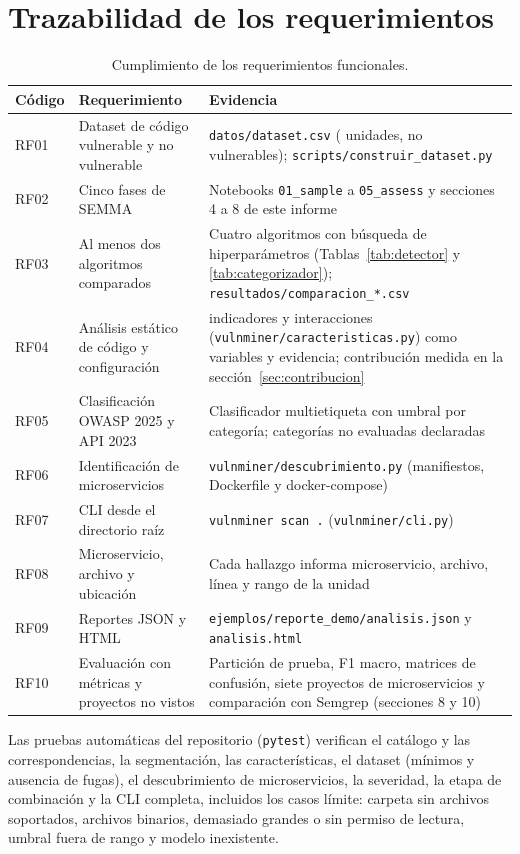 \documentclass[12pt,a4paper]{article}
\newcommand{\ruta}[1]{\nolinkurl{#1}}
\newcommand{\cod}[1]{\texttt{#1}}
\begin{document}
\section{Trazabilidad de los requerimientos}
\begin{table}[H]
\centering\footnotesize
\caption{Cumplimiento de los requerimientos funcionales.}
\label{tab:requisitos}
\begin{tabularx}{\textwidth}{@{}lP{4.3cm}Y@{}}
\toprule
\textbf{Código} & \textbf{Requerimiento} & \textbf{Evidencia}\\
\midrule
RF01 & Dataset de código vulnerable y no vulnerable & \ruta{datos/dataset.csv} (\nUnidades{} unidades, \nSeguras{} no vulnerables); \ruta{scripts/construir_dataset.py}\\
RF02 & Cinco fases de SEMMA & Notebooks \ruta{01_sample} a \ruta{05_assess} y secciones 4 a 8 de este informe\\
RF03 & Al menos dos algoritmos comparados & Cuatro algoritmos con búsqueda de hiperparámetros (Tablas~\ref{tab:detector} y \ref{tab:categorizador}); \ruta{resultados/comparacion_*.csv}\\
RF04 & Análisis estático de código y configuración & \nIndicadores{} indicadores y \nDerivadas{} interacciones (\ruta{vulnminer/caracteristicas.py}) como variables y evidencia; contribución medida en la sección~\ref{sec:contribucion}\\
RF05 & Clasificación OWASP 2025 y API 2023 & Clasificador multietiqueta con umbral por categoría; categorías no evaluadas declaradas\\
RF06 & Identificación de microservicios & \ruta{vulnminer/descubrimiento.py} (manifiestos, Dockerfile y docker-compose)\\
RF07 & CLI desde el directorio raíz & \cod{vulnminer scan .} (\ruta{vulnminer/cli.py})\\
RF08 & Microservicio, archivo y ubicación & Cada hallazgo informa microservicio, archivo, línea y rango de la unidad\\
RF09 & Reportes JSON y HTML & \ruta{ejemplos/reporte_demo/analisis.json} y \ruta{analisis.html}\\
RF10 & Evaluación con métricas y proyectos no vistos & Partición de prueba, F1 macro, matrices de confusión, siete proyectos de microservicios y comparación con Semgrep (secciones 8 y 10)\\
\bottomrule
\end{tabularx}
\end{table}

Las pruebas automáticas del repositorio (\cod{pytest}) verifican el catálogo y las correspondencias, la segmentación, las características, el dataset (mínimos y ausencia de fugas), el descubrimiento de microservicios, la severidad, la etapa de combinación y la CLI completa, incluidos los casos límite: carpeta sin archivos soportados, archivos binarios, demasiado grandes o sin permiso de lectura, umbral fuera de rango y modelo inexistente.
\end{document}
